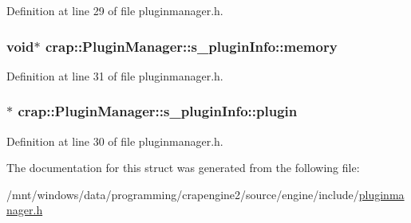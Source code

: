 Definition at line 29 of file pluginmanager.\+h.

\hypertarget{structcrap_1_1_plugin_manager_1_1s__plugin_info_aa9e91a882db31c6be7ac1a2ffbf891a4}{}
\subsubsection[{memory}]{\setlength{\rightskip}{0pt plus 5cm}void$\ast$ crap\+::\+Plugin\+Manager\+::s\+\_\+plugin\+Info\+::memory}\label{structcrap_1_1_plugin_manager_1_1s__plugin_info_aa9e91a882db31c6be7ac1a2ffbf891a4}


Definition at line 31 of file pluginmanager.\+h.

\hypertarget{structcrap_1_1_plugin_manager_1_1s__plugin_info_a51bdb002b066f8a4d440f783fd3c67f3}{}
\subsubsection[{plugin}]{$\ast$ crap\+::\+Plugin\+Manager\+::s\+\_\+plugin\+Info\+::plugin}\label{structcrap_1_1_plugin_manager_1_1s__plugin_info_a51bdb002b066f8a4d440f783fd3c67f3}


Definition at line 30 of file pluginmanager.\+h.



The documentation for this struct was generated from the following file\+:\begin{DoxyCompactItemize}
\item 
/mnt/windows/data/programming/crapengine2/source/engine/include/\hyperlink{pluginmanager_8h}{pluginmanager.\+h}\end{DoxyCompactItemize}
